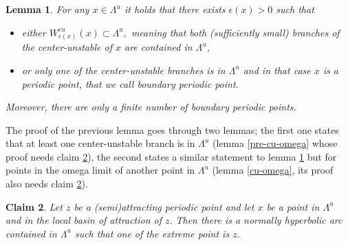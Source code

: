 \documentclass[a4paper,11pt]{article}
\newtheorem{lemma}{Lemma}
\newtheorem{claim}[lemma]{Claim}
\theoremstyle{definition}
\def\La{\Lambda}
\def\e{\epsilon}
\def\Ga{\Gamma}
\def\La{\Lambda}
\def\Ga{\Gamma}
\begin{document}
\begin{lemma}\label{whole-centerunstable} For any $x\in \La^u$ it holds that  there exists $\e(x)>0$ such that

\begin{itemize}
    \item[--]either  $W^{cu}_{\e(x)}(x)\subset \La^u,$ meaning that both (sufficiently small) branches of the center-unstable of $x$ are contained in $\La^u$, 

    \item[--] or only  one of the center-unstable branches  is in $\La^u$ and in that case $x$ is a periodic point, that we call boundary periodic point. 
    
\end{itemize}

    Moreover, there are only a finite number of boundary periodic points.
    
\end{lemma}
The proof of the previous lemma goes through two lemmas; the first one  states that at least one center-unstable branch is in $\La^u$ (lemma \ref{pre-cu-omega} whose proof needs claim \ref{attracting}), the second  states a similar statement to lemma \ref{whole-centerunstable} but for points in the omega limit of another point in $\La^u$ (lemma \ref{cu-omega},  its proof also needs claim \ref{attracting}).



\begin{claim}\label{attracting} Let $z$ be a (semi)attracting periodic point and let $x$ be a point in $\La^u$ and in the local basin of attraction of $z.$ Then there is a normally hyperbolic arc contained in $\La^u$ such that one of the extreme point is $z.$ 
    
\end{claim}
\end{document}
